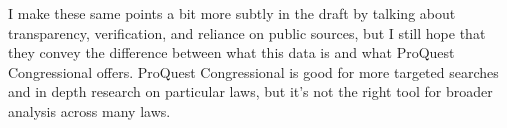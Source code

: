 \documentclass{article}
\begin{document}
I make these same points a bit more subtly in the draft by talking about transparency, verification, and reliance on public sources, but I still hope that they convey the difference between what this data is and what ProQuest Congressional offers. ProQuest Congressional is good for more targeted searches and in depth research on particular laws, but it's not the right tool for broader analysis across many laws. 
\end{document}
